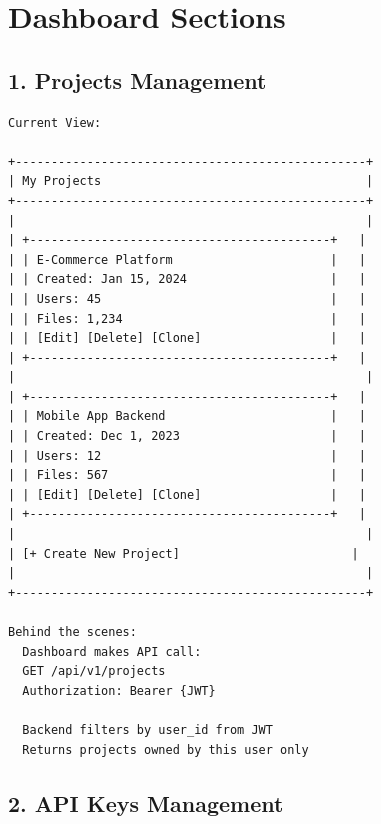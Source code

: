 \documentclass[11pt,a4paper]{report}
\begin{document}
\chapter{Dashboard Sections}



\section{1. Projects Management}


\begin{lstlisting}[language=text]
Current View:

+-------------------------------------------------+
| My Projects                                     |
+-------------------------------------------------+
|                                                 |
| +------------------------------------------+   |
| | E-Commerce Platform                      |   |
| | Created: Jan 15, 2024                    |   |
| | Users: 45                                |   |
| | Files: 1,234                             |   |
| | [Edit] [Delete] [Clone]                  |   |
| +------------------------------------------+   |
|                                                 |
| +------------------------------------------+   |
| | Mobile App Backend                       |   |
| | Created: Dec 1, 2023                     |   |
| | Users: 12                                |   |
| | Files: 567                               |   |
| | [Edit] [Delete] [Clone]                  |   |
| +------------------------------------------+   |
|                                                 |
| [+ Create New Project]                        |
|                                                 |
+-------------------------------------------------+

Behind the scenes:
  Dashboard makes API call:
  GET /api/v1/projects
  Authorization: Bearer {JWT}
  
  Backend filters by user_id from JWT
  Returns projects owned by this user only
\end{lstlisting}


\section{2. API Keys Management}
\end{document}
